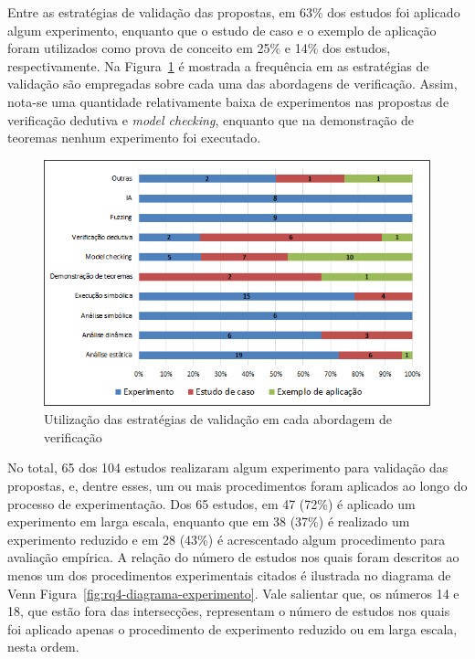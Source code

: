 Entre as estratégias de validação das propostas, em 63\% dos estudos foi aplicado algum experimento, enquanto que o estudo de caso e o exemplo de aplicação foram utilizados como prova de conceito em 25\% e 14\% dos estudos, respectivamente. Na Figura~\ref{fig:rq4-validacao-propostas} é mostrada a frequência em as estratégias de validação são empregadas sobre cada uma das abordagens de verificação. Assim, nota-se uma quantidade relativamente baixa de experimentos nas propostas de verificação dedutiva e \textit{model checking}, enquanto que na demonstração de teoremas nenhum experimento foi executado.

\begin{figure}[!htb]
 \caption{Utilização das estratégias de validação em cada abordagem de verificação}
 \label{fig:rq4-validacao-propostas}
 \centering
 \includegraphics[scale=0.65]{figuras/rq4-validacao-propostas.png}
 \fdadospesquisa
\end{figure}

No total, 65 dos 104 estudos realizaram algum experimento para validação das propostas, e, dentre esses, um ou mais procedimentos foram aplicados ao longo do processo de experimentação. Dos 65 estudos, em 47 (72\%) é aplicado um experimento em larga escala, enquanto que em 38 (37\%) é realizado um experimento reduzido e em 28 (43\%) é acrescentado algum procedimento para avaliação empírica. A relação do número de estudos nos quais foram descritos ao menos um dos procedimentos experimentais citados é ilustrada no diagrama de Venn Figura~\ref{fig:rq4-diagrama-experimento}. Vale salientar que, os números 14 e 18, que estão fora das intersecções, representam o número de estudos nos quais foi aplicado apenas o procedimento de experimento reduzido ou em larga escala, nesta ordem.

